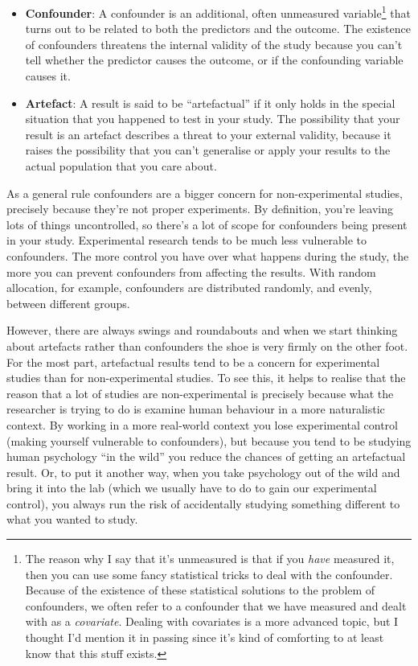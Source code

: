 \documentclass[
]{book}
\providecommand{\tightlist}{%
  \setlength{\itemsep}{0pt}\setlength{\parskip}{0pt}}
\begin{document}
\begin{itemize}
\tightlist
\item
  {\textbf{Confounder}}: A confounder is an additional, often unmeasured variable\footnote{The reason why I say that it's unmeasured is that if you \emph{have} measured it, then you can use some fancy statistical tricks to deal with the confounder. Because of the existence of these statistical solutions to the problem of confounders, we often refer to a confounder that we have measured and dealt with as a \emph{covariate}. Dealing with covariates is a more advanced topic, but I thought I'd mention it in passing since it's kind of comforting to at least know that this stuff exists.} that turns out to be related to both the predictors and the outcome. The existence of confounders threatens the internal validity of the study because you can't tell whether the predictor causes the outcome, or if the confounding variable causes it.
\item
  {\textbf{Artefact}}: A result is said to be ``artefactual'' if it only holds in the special situation that you happened to test in your study. The possibility that your result is an artefact describes a threat to your external validity, because it raises the possibility that you can't generalise or apply your results to the actual population that you care about.
\end{itemize}

As a general rule confounders are a bigger concern for non-experimental studies, precisely because they're not proper experiments. By definition, you're leaving lots of things uncontrolled, so there's a lot of scope for confounders being present in your study. Experimental research tends to be much less vulnerable to confounders. The more control you have over what happens during the study, the more you can prevent confounders from affecting the results. With random allocation, for example, confounders are distributed randomly, and evenly, between different groups.

However, there are always swings and roundabouts and when we start thinking about artefacts rather than confounders the shoe is very firmly on the other foot. For the most part, artefactual results tend to be a concern for experimental studies than for non-experimental studies. To see this, it helps to realise that the reason that a lot of studies are non-experimental is precisely because what the researcher is trying to do is examine human behaviour in a more naturalistic context. By working in a more real-world context you lose experimental control (making yourself vulnerable to confounders), but because you tend to be studying human psychology ``in the wild'' you reduce the chances of getting an artefactual result. Or, to put it another way, when you take psychology out of the wild and bring it into the lab (which we usually have to do to gain our experimental control), you always run the risk of accidentally studying something different to what you wanted to study.
\end{document}

